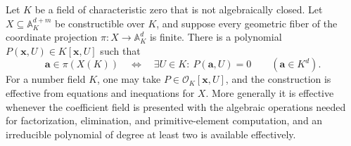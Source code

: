 \begin{theorem}\label{thm:finite-fibre-arbitrary-field}
Let $K$ be a field of characteristic zero that is not algebraically
closed. Let $X\subseteq\mathbb A^{d+m}_K$ be constructible over $K$,
and suppose every geometric fiber of the coordinate projection
$\pi:X\to\mathbb A^d_K$ is finite. There is a polynomial
$P(\mathbf x,U)\in K[\mathbf x,U]$ such that
\[
 \mathbf a\in\pi(X(K))
 \quad\Longleftrightarrow\quad
 \exists U\in K:\ P(\mathbf a,U)=0
 \qquad(\mathbf a\in K^d).
\]
For a number field $K$, one may take $P\in\mathcal O_K[\mathbf x,U]$,
and the construction is effective from equations and inequations for
$X$. More generally it is effective whenever the coefficient field is
presented with the algebraic operations needed for factorization,
elimination, and primitive-element computation, and an irreducible
polynomial of degree at least two is available effectively.
\end{theorem}
